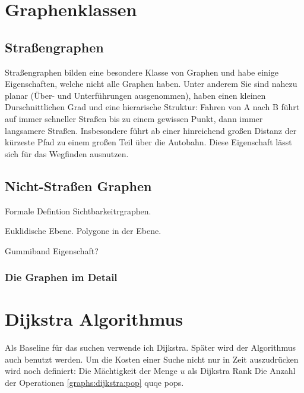 \section{Graphenklassen}
\subsection{Straßengraphen}

Straßengraphen bilden eine besondere Klasse von Graphen und habe einige Eigenschaften, welche nicht alle Graphen haben.
Unter anderem
Sie sind nahezu planar (Über- und Unterführungen ausgenommen), haben einen kleinen Durschnittlichen Grad und eine hierarische Struktur:
Fahren von A nach B führt auf immer schneller Straßen bis zu einem gewissen Punkt, dann immer langsamere Straßen.
Insbesondere führt ab einer hinreichend großen Distanz der kürzeste Pfad zu einem großen Teil über die Autobahn.
Diese Eigenschaft lässt sich für das Wegfinden ausnutzen.

\subsection{Nicht-Straßen Graphen}

Formale Defintion Sichtbarkeitrgraphen.

Euklidische Ebene.
Polygone in der Ebene.

Gummiband Eigenschaft?

\subsubsection{Die Graphen im Detail}


\section{Dijkstra Algorithmus}

Als Baseline für das suchen verwende ich Dijkstra.
Später wird der Algorithmus auch benutzt werden.
Um die Kosten einer Suche nicht nur in Zeit auszudrücken wird noch definiert:
Die Mächtigkeit der Menge $u$ als Dijkstra Rank
Die Anzahl der Operationen \ref{graphs:dijkstra:pop} quqe pops.



